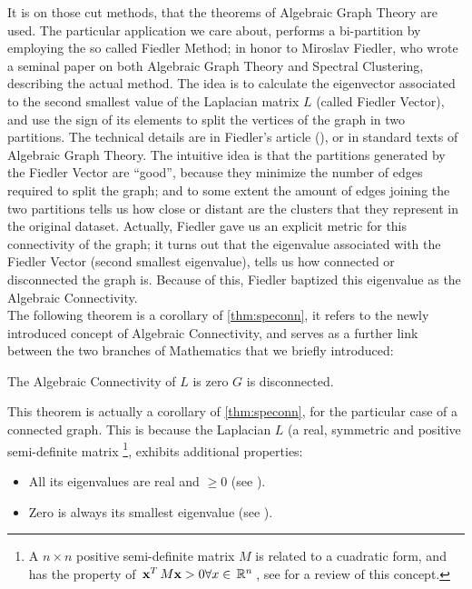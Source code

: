 It is on those cut methods, that the theorems of Algebraic
Graph Theory are used. The particular application we care about,
performs a bi-partition by employing the so called Fiedler Method; in
honor to Miroslav Fiedler, who wrote a seminal paper on both Algebraic
Graph Theory and Spectral Clustering, describing the actual
method. The idea is to calculate the eigenvector associated to the
second smallest value of the Laplacian matrix $L$ (called Fiedler
Vector), and use the sign of 
its elements to split the vertices of the graph in two
partitions. The technical details are in Fiedler's article
(\cite{fiedler73}), or in standard texts of Algebraic Graph Theory.
The intuitive idea is that the partitions generated by the Fiedler
Vector are ``good'', because they minimize the number of edges
required to split the graph; and to some extent the amount of edges
joining the two partitions tells us how close or distant are the
clusters that they represent in the original dataset. Actually,
Fiedler gave us an explicit metric for this connectivity of the graph;
it turns out that the eigenvalue associated with the Fiedler Vector
(second smallest eigenvalue), tells us how connected or disconnected
the graph is. Because of this, Fiedler baptized this eigenvalue as the
Algebraic Connectivity. \\

The following theorem is a corollary of \cref{thm:speconn}, 
it refers to the newly introduced concept of Algebraic Connectivity,
and serves as a further link between the two branches of Mathematics
that we briefly introduced: \\

\begin{theorem}
  \label{thm:algconn}
  The Algebraic Connectivity of $L$ is zero \iff $G$ is disconnected. 
\end{theorem}

This theorem is actually a corollary of \cref{thm:speconn}, for
the particular case of a connected graph. This is because the
Laplacian $L$ (a real, symmetric and positive semi-definite
matrix \footnote{A $n \times n$ positive semi-definite matrix $M$ is
  related to a 
  cuadratic form, and has the property of $\,{\mathbf{x}}^{T}\,M\mathbf{x} > 0
\forall x \in \,\mathbb{R}^{n}\,$, see \cite{strange88} for a review of this concept.}, exhibits additional properties: \\ 

\begin{itemize}
  \item All its eigenvalues are real and $ \ge 0$ (see \cite{strang88}). \\
  \item Zero is always its smallest eigenvalue (see \cite{luxburg07}).
\end{itemize}
\hfill

